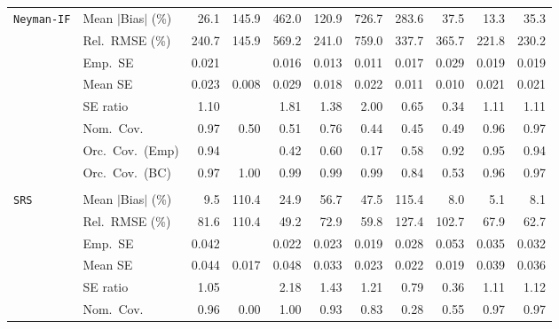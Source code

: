 \begin{landscape}
\begin{longtable}{llrrrrrrrrr}
\addlinespace[2pt]
\quad \texttt{Neyman-IF} & Mean $|$Bias$|$ (\%) & \cellcolor{ranktwo}26.1 & 145.9 & 462.0 & 120.9 & 726.7 & 283.6 & 37.5 & \cellcolor{rankone}13.3 & \cellcolor{rankthree}35.3 \\
 & Rel.\ RMSE (\%) & 240.7 & \cellcolor{rankone}145.9 & 569.2 & 241.0 & 759.0 & 337.7 & 365.7 & \cellcolor{ranktwo}221.8 & \cellcolor{rankthree}230.2 \\
 & Emp.\ SE & 0.021 &  & 0.016 & 0.013 & 0.011 & 0.017 & 0.029 & 0.019 & 0.019 \\
 & Mean SE & 0.023 & 0.008 & 0.029 & 0.018 & 0.022 & 0.011 & 0.010 & 0.021 & 0.021 \\
 & SE ratio & \cellcolor{rankone}1.10 &  & 1.81 & 1.38 & 2.00 & \cellcolor{rankthree}0.65 & 0.34 & \cellcolor{ranktwo}1.11 & \cellcolor{ranktwo}1.11 \\
 & Nom.\ Cov. & \cellcolor{ranktwo}0.97 & 0.50 & 0.51 & \cellcolor{rankthree}0.76 & 0.44 & 0.45 & 0.49 & \cellcolor{rankone}0.96 & \cellcolor{ranktwo}0.97 \\
 & Orc.\ Cov.\ (Emp) & \cellcolor{ranktwo}0.94 &  & 0.42 & 0.60 & 0.17 & 0.58 & \cellcolor{rankthree}0.92 & \cellcolor{rankone}0.95 & \cellcolor{ranktwo}0.94 \\
 & Orc.\ Cov.\ (BC) & \cellcolor{ranktwo}0.97 & 1.00 & \cellcolor{rankthree}0.99 & \cellcolor{rankthree}0.99 & \cellcolor{rankthree}0.99 & 0.84 & 0.53 & \cellcolor{rankone}0.96 & \cellcolor{ranktwo}0.97 \\
\addlinespace[2pt]
\multicolumn{11}{l}{\textbf{Continuous Phase-One Covariates}} \\
\addlinespace[2pt]
\quad \texttt{SRS} & Mean $|$Bias$|$ (\%) & 9.5 & 110.4 & 24.9 & 56.7 & 47.5 & 115.4 & \cellcolor{ranktwo}8.0 & \cellcolor{rankone}5.1 & \cellcolor{rankthree}8.1 \\
 & Rel.\ RMSE (\%) & 81.6 & 110.4 & \cellcolor{rankone}49.2 & 72.9 & \cellcolor{ranktwo}59.8 & 127.4 & 102.7 & 67.9 & \cellcolor{rankthree}62.7 \\
 & Emp.\ SE & 0.042 &  & 0.022 & 0.023 & 0.019 & 0.028 & 0.053 & 0.035 & 0.032 \\
 & Mean SE & 0.044 & 0.017 & 0.048 & 0.033 & 0.023 & 0.022 & 0.019 & 0.039 & 0.036 \\
 & SE ratio & \cellcolor{rankone}1.05 &  & 2.18 & 1.43 & 1.21 & 0.79 & 0.36 & \cellcolor{ranktwo}1.11 & \cellcolor{rankthree}1.12 \\
 & Nom.\ Cov. & \cellcolor{rankone}0.96 & 0.00 & \cellcolor{rankthree}1.00 & \cellcolor{ranktwo}0.93 & 0.83 & 0.28 & 0.55 & \cellcolor{ranktwo}0.97 & \cellcolor{ranktwo}0.97 \\

\end{longtable}
\end{landscape}
